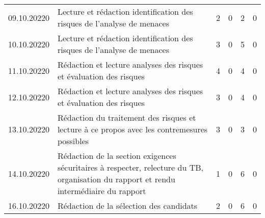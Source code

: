 \begin{landscape}
\begin{longtable}[c]{lp{10cm}rrrr}
	09.10.20220 
	& Lecture et rédaction identification des risques de l'analyse de menaces
	& 2 %
	& 0 %
	& 2 %
	& 0\\ %
	
	10.10.20220 
	& Lecture et rédaction identification des risques de l'analyse de menaces
	& 3 %
	& 0 %
	& 5 %
	& 0\\ %
	
	11.10.20220 
	& Rédaction et lecture analyses des risques et évaluation des risques
	& 4 %
	& 0 %
	& 4 %
	& 0\\ %
	
	12.10.20220 
	& Rédaction et lecture analyses des risques et évaluation des risques
	& 3 %
	& 0 %
	& 4 %
	& 0\\ %
	
	13.10.20220 
	& Rédaction du traitement des risques et lecture à ce propos avec les contremesures possibles
	& 3 %
	& 0 %
	& 3 %
	& 0\\ %
	
	14.10.20220 
	& Rédaction de la section exigences sécuritaires à respecter, relecture du TB, organisation du rapport et rendu intermédiaire du rapport
	& 1 %
	& 0 %
	& 6 %
	& 0\\ %

	16.10.20220
	& Rédaction de la sélection des candidats
	& 2 %
	& 0 %
	& 6 %
	& 0\\ %
	
\end{longtable}


\end{landscape}

